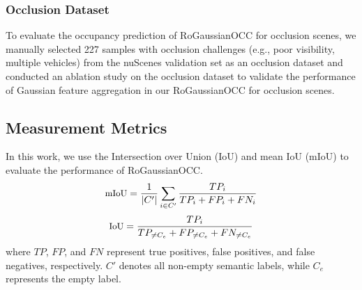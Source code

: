 \documentclass[journal]{IEEEtran}
\begin{document}
\subsubsection{Occlusion Dataset}

To evaluate the occupancy prediction of RoGaussianOCC for occlusion scenes, we manually selected 227 samples with occlusion challenges (e.g., poor visibility, multiple vehicles) from the nuScenes validation set as an occlusion dataset and conducted an ablation study on the occlusion dataset to validate the performance of Gaussian feature aggregation in our RoGaussianOCC for occlusion scenes.


\subsection{Measurement Metrics}
In this work, we use the Intersection over Union (IoU) and mean IoU (mIoU) to evaluate the performance of RoGaussianOCC.
\begin{equation} \small
\text{mIoU} = \frac{1}{|C'|} \sum_{i \in C'} \frac{TP_i}{TP_i + FP_i + FN_i} 
\end{equation}
\begin{equation} \small
\text{IoU} = \frac{TP_i}{TP_{\neq C_e} + FP_{\neq C_e} + FN_{\neq C_e}} 
\end{equation}
where {\small $TP$}, {\small $FP$}, and {\small $FN$} represent true positives, false positives, and false negatives, respectively. 
{\small $C'$} denotes all non-empty semantic labels, while {\small $C_e$} represents the empty label.
\end{document}
